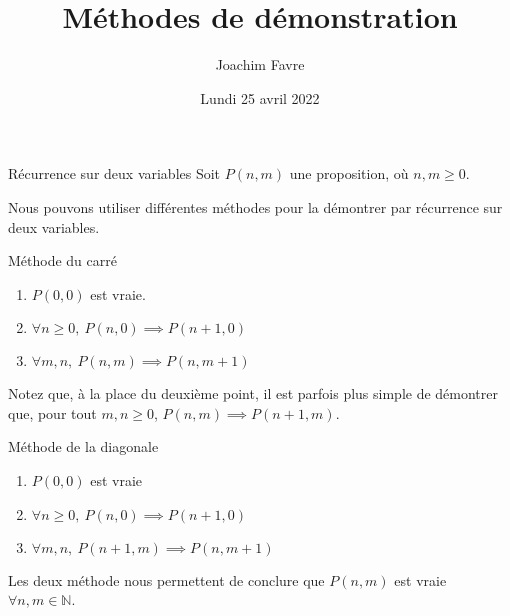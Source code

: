 \documentclass[a4paper]{article}
\title{Méthodes de démonstration}
\author{Joachim Favre}
\date{Lundi 25 avril 2022}
\begin{document}
\maketitle


\begin{parag}{Récurrence sur deux variables}
    Soit $P\left(n, m\right)$ une proposition, où $n, m \geq 0$.

    Nous pouvons utiliser différentes méthodes pour la démontrer par récurrence sur deux variables.

    \begin{subparag}{Méthode du carré}
        \begin{enumerate}[left=0pt]
            \item $P\left(0, 0\right)$ est vraie.
            \item $\forall n \geq 0, \ P\left(n, 0\right) \implies P\left(n + 1, 0\right)$
            \item $\forall m, n, \ P\left(n, m\right) \implies P\left(n, m+1\right)$
        \end{enumerate}

        Notez que, à la place du deuxième point, il est parfois plus simple de démontrer que, pour tout $m, n \geq 0$, $P\left(n, m\right) \implies P\left(n+1, m\right)$.

    \end{subparag}
    
    \begin{subparag}{Méthode de la diagonale}
        \begin{enumerate}[left=0pt]
            \item $P\left(0, 0\right)$ est vraie
            \item $\forall n \geq 0, \ P\left(n, 0\right) \implies P\left(n+1, 0\right)$
            \item $\forall m, n,\ P\left(n+1, m\right) \implies P\left(n, m+1\right)$
        \end{enumerate}

    \end{subparag}

    Les deux méthode nous permettent de conclure que $P\left(n, m\right)$ est vraie $\forall n, m \in \mathbb{N}$.
\end{parag}
\end{document}
